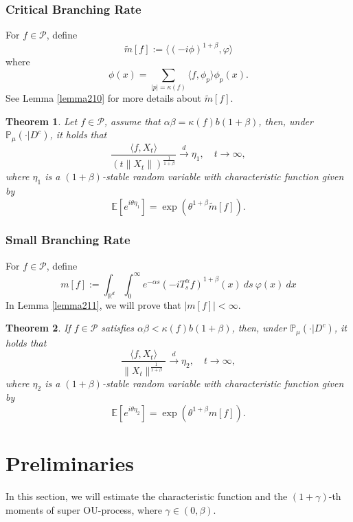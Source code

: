 \documentclass[12pt,oneside,english]{amsart}
\theoremstyle{plain}
\newtheorem{thm}{Theorem}[section]
\theoremstyle{definition}
\numberwithin{equation}{section}
\begin{document}
\subsubsection{Critical Branching Rate}
For $f\in \mathcal{P}$, define
$$\tilde{m}[f]:= \langle(-i\phi)^{1+\beta},\varphi\rangle$$
where
$$\phi(x)=\sum_{|p|=\kappa(f)}\langle f,\phi_p\rangle\phi_p(x).$$
See Lemma \ref{lemma210} for more details about $\tilde{m}[f]$.
\begin{thm}\label{Theorem12}
Let $f\in\mathcal{P}$, assume that  $\alpha\beta=\kappa(f)b(1+\beta)$, then, under $\mathbb{P}_{\mu}(\cdot|D^c)$, it holds that
$$\frac{\langle f,X_t\rangle}{\left(t\|X_t\|\right)^{\frac{1}{1+\beta}}}\xrightarrow{d} \eta_1, \quad t\rightarrow \infty,$$
where $\eta_1$ is a $(1+\beta)$-stable random variable with characteristic function given by
$$\mathbb{E} [e^{i\theta \eta_1}]=\exp(\theta^{1+\beta}\tilde{m}[f]).$$
\end{thm}

\subsubsection{Small Branching Rate}

For $f\in \mathcal{P}$, define
$$m[f]:=\int_{\mathbb{R}^d}\int_0^{\infty} e^{-\alpha s}(-iT_{s}^{\alpha}f)^{1+\beta}(x)~ds~\varphi(x)~dx$$
In Lemma \ref{lemma211}, we will prove that $|m[f]|<\infty$.
\begin{thm}\label{Theorem13}
    If $f\in\mathcal{P}$ satisfies  $\alpha\beta<\kappa(f)b(1+\beta)$, then, under $\mathbb{P}_{\mu}(\cdot|D^c)$, it holds that
    $$\frac{\langle f,X_t\rangle}{\|X_t\|^{\frac{1}{1+\beta}}}\xrightarrow{d} \eta_2, \quad t\rightarrow \infty,$$
    where $\eta_2$ is a $(1+\beta)$-stable random variable with characteristic function given by
    $$\mathbb{E} [e^{i\theta \eta_2}]=\exp(\theta^{1+\beta}m[f]).$$
\end{thm}

\section{Preliminaries}
    In this section, we will estimate the characteristic function and the $(1+\gamma)$-th moments of super OU-process, where $\gamma \in (0,\beta)$.
\end{document}
